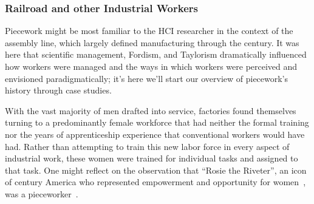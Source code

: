 \documentclass[trackingWork]{subfiles}
\begin{document}



\subsubsection{Railroad and other Industrial Workers}
{Piecework might be most familiar to the HCI researcher in the context of the assembly line, which largely defined manufacturing through the  century.}
It was here that
scientific management, Fordism, and Taylorism
dramatically influenced how workers were managed and
the ways in which workers were perceived and envisioned paradigmatically;
it's here we'll start our overview of piecework's history through case studies. 


With the vast majority of men drafted into service,
factories found themselves turning to
a predominantly female workforce that had neither
the formal training nor
the years of apprenticeship experience
that conventional workers would have had.
Rather than attempting to train this new labor force in every aspect of industrial work,
these women were trained for individual tasks
and assigned to that task. %
One might reflect on the observation that ``Rosie the Riveter'',
an icon of  century America who
represented empowerment and opportunity for women~\cite{honey1985creating},
was a pieceworker~\cite{davies2014origins}.

\end{document}
